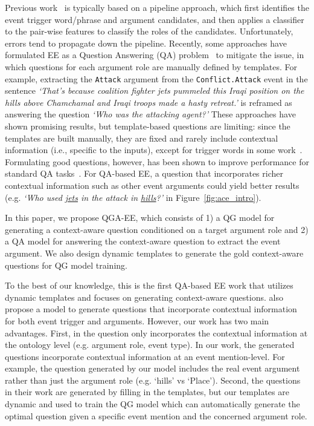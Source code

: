 Previous work~\cite{li2013joint,nguyen2016joint,sha2018jointly} is typically based on a pipeline approach, which first identifies the event trigger word/phrase and argument candidates, and then applies a classifier to the pair-wise features to classify the roles of the candidates.  Unfortunately, errors tend to propagate down the pipeline.
Recently, some approaches have formulated EE as a Question Answering (QA) problem~\cite{du2020event,li2020event,lyu2021zero} to mitigate the issue, in which questions for each argument role are manually defined by templates. 
For example, extracting the \texttt{Attack} argument from the \texttt{Conflict.Attack} event in the sentence \textit{`That's because coalition fighter jets pummeled this Iraqi position on the hills  above Chamchamal and Iraqi troops made a hasty retreat.'} is reframed as answering the question \textit{`Who was the attacking agent?'} 
These approaches have shown promising results, but template-based questions are limiting: since the templates are built manually, they are fixed and rarely include contextual information (i.e., specific to the inputs), except for trigger words in some work~\cite{du2020event}. Formulating good questions, however, has been shown to improve performance for standard QA tasks~\cite{rajpurkar2018know}. 
For QA-based EE, a question that incorporates richer contextual information such as other event arguments could yield better results (e.g.  \textit{`Who used \underline{jets} in the attack in \underline{hills}?'} in Figure~\ref{fig:ace_intro}). 

In this paper, we propose QGA-EE, which consists of 1) a QG model for generating a context-aware question conditioned on a target argument role and 2) a QA model for answering the context-aware question to extract the event argument. We also design dynamic templates to generate the gold context-aware questions for QG model training. 

To the best of our knowledge, this is the first QA-based EE work that utilizes dynamic templates and focuses on generating context-aware questions.
\citet{li2020event} also propose a model to generate questions that incorporate contextual information for both event trigger and arguments. However, our work has two main advantages. First, in \citet{li2020event} the question only incorporates the contextual information at the ontology level (e.g. argument role, event type). In our work, the generated questions incorporate contextual information at an event mention-level. For example, the question generated by our model includes the real event argument rather than just the argument role (e.g. ‘hills’ vs ‘Place’). Second, the questions in their work are generated by filling in the templates, but our templates are dynamic and used to train the QG model which can automatically generate the optimal question given a specific event mention and the concerned argument role.

